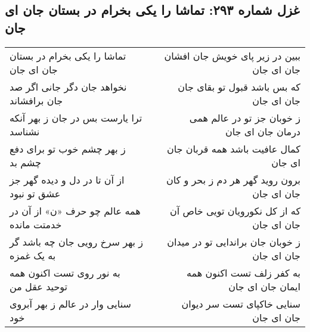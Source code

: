\begin{center}
\section*{غزل شماره ۲۹۳: تماشا را یکی بخرام در بستان جان ای جان}
\label{sec:293}
\begin{longtable}{l p{0.5cm} r}
تماشا را یکی بخرام در بستان جان ای جان
&&
ببین در زیر پای خویش جان افشان جان ای جان
\\
نخواهد جان دگر جانی اگر صد جان برافشاند
&&
که بس باشد قبول تو بقای جان جان ای جان
\\
ترا یارست بس در جان ز بهر آنکه نشناسد
&&
ز خوبان جز تو در عالم همی درمان جان ای جان
\\
ز بهر چشم خوب تو برای دفع چشم بد
&&
کمال عافیت باشد همه قربان جان ای جان
\\
از آن تا در دل و دیده گهر جز عشق تو نبود
&&
برون روید گهر هر دم ز بحر و کان جان ای جان
\\
همه عالم چو حرف «ن» از آن در خدمتت مانده
&&
که از کل نکورویان تویی خاص آن جان ای جان
\\
ز بهر سرخ رویی جان چه باشد گر به یک غمزه
&&
ز خوبان جان براندایی تو در میدان جان ای جان
\\
به نور روی تست اکنون همه توحید عقل من
&&
به کفر زلف تست اکنون همه ایمان جان ای جان
\\
سنایی وار در عالم ز بهر آبروی خود
&&
سنایی خاکپای تست سر دیوان جان ای جان
\\
\end{longtable}
\end{center}
